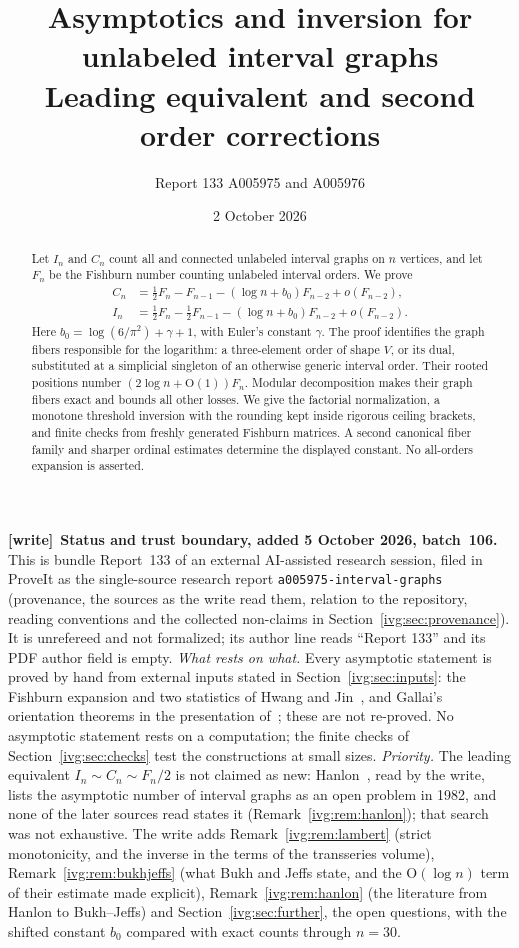 \documentclass[11pt,letterpaper]{article}
\title{\textbf{Asymptotics and inversion for unlabeled interval graphs}\\[5pt]\large Leading equivalent and second order corrections}
\author{Report 133 \quad A005975 and A005976}
\date{2 October 2026}
\theoremstyle{definition}\newtheorem{definition}[theorem]{Definition}
\theoremstyle{remark}\newtheorem{remark}[theorem]{Remark}
\newcommand{\OO}{\mathrm O}
\newcommand{\file}[1]{\nolinkurl{#1}}
\newenvironment{writenote}[1][]{\par\smallskip\begingroup\small
 \noindent\textbf{[write]}\if\relax\detokenize{#1}\relax\else~\textbf{#1.}\fi\ }%
 {\par\endgroup\smallskip}
\begin{document}
\maketitle
\begin{abstract}
Let $I_n$ and $C_n$ count all and connected unlabeled interval graphs on $n$ vertices, and let $F_n$ be the Fishburn number counting unlabeled interval orders. We prove
\[
 \begin{aligned}
 C_n&=\tfrac12F_n-F_{n-1}-(\log n+b_0)F_{n-2}+o(F_{n-2}),\\
 I_n&=\tfrac12F_n-\tfrac12F_{n-1}-(\log n+b_0)F_{n-2}+o(F_{n-2}).
\end{aligned}
\]
Here $b_0=\log(6/\pi^2)+\gamma+1$, with Euler's constant $\gamma$. The proof identifies the graph fibers responsible for the logarithm: a three-element order of shape $V$, or its dual, substituted at a simplicial singleton of an otherwise generic interval order. Their rooted positions number $(2\log n+\OO(1))F_n$. Modular decomposition makes their graph fibers exact and bounds all other losses. We give the factorial normalization, a monotone threshold inversion with the rounding kept inside rigorous ceiling brackets, and finite checks from freshly generated Fishburn matrices. A second canonical fiber family and sharper ordinal estimates determine the displayed constant. No all-orders expansion is asserted.
\end{abstract}
\begin{writenote}[Status and trust boundary, added 5 October 2026, batch~106]
This is bundle Report~133 of an external AI-assisted research session,
filed in ProveIt as the single-source research report
\file{a005975-interval-graphs} (provenance, the sources as the write read
them, relation to the repository, reading conventions and the collected
non-claims in Section~\ref{ivg:sec:provenance}). It is unrefereed and not
formalized; its author line reads ``Report 133'' and its PDF author field is
empty. \emph{What rests on what.} Every asymptotic statement is proved by
hand from external inputs stated in Section~\ref{ivg:sec:inputs}: the
Fishburn expansion and two statistics of Hwang and Jin~\cite{HJ}, and
Gallai's orientation theorems in the presentation of~\cite{Gallai}; these
are not re-proved. No asymptotic statement rests on a computation; the
finite checks of Section~\ref{ivg:sec:checks} test the constructions at small
sizes. \emph{Priority.} The leading equivalent $I_n\sim C_n\sim F_n/2$ is not
claimed as new: Hanlon~\cite{Hanlon}, read by the write, lists the
asymptotic number of interval graphs as an open problem in 1982, and none of
the later sources read states it (Remark~\ref{ivg:rem:hanlon}); that search
was not exhaustive. The write adds Remark~\ref{ivg:rem:lambert} (strict
monotonicity, and the inverse in the terms of the transseries volume),
Remark~\ref{ivg:rem:bukhjeffs} (what Bukh and Jeffs state, and the
$\OO(\log n)$ term of their estimate made explicit),
Remark~\ref{ivg:rem:hanlon} (the literature from Hanlon to Bukh--Jeffs) and
Section~\ref{ivg:sec:further}, the open questions, with the shifted constant
$b_0$ compared with exact counts through $n=30$.
\end{writenote}
{\setlength{\parskip}{0pt}\setcounter{tocdepth}{1}\small\tableofcontents}
\clearpage
\end{document}
